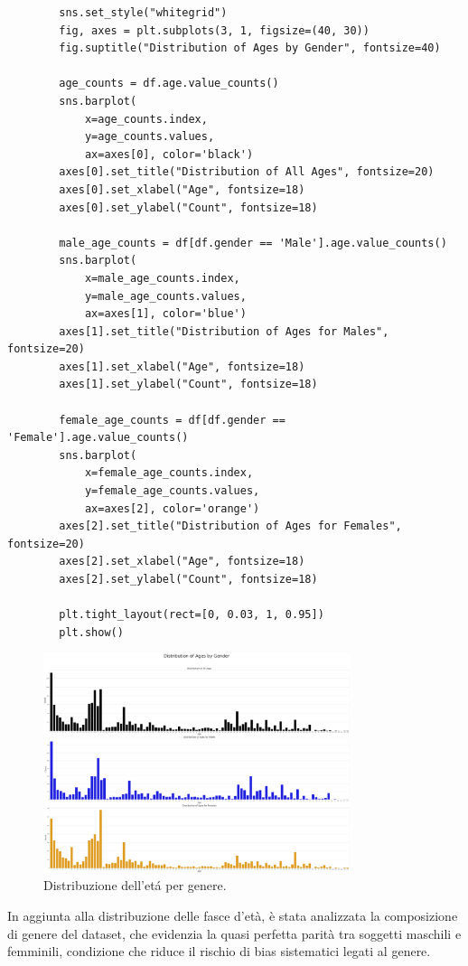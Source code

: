 \documentclass[a4paper,12pt]{report}
\begin{document}
	\begin{verbatim}
		sns.set_style("whitegrid")
		fig, axes = plt.subplots(3, 1, figsize=(40, 30))
		fig.suptitle("Distribution of Ages by Gender", fontsize=40) 
		
		age_counts = df.age.value_counts()
		sns.barplot(
			x=age_counts.index, 
			y=age_counts.values, 
			ax=axes[0], color='black')
		axes[0].set_title("Distribution of All Ages", fontsize=20)
		axes[0].set_xlabel("Age", fontsize=18)
		axes[0].set_ylabel("Count", fontsize=18)
		
		male_age_counts = df[df.gender == 'Male'].age.value_counts()
		sns.barplot(
			x=male_age_counts.index, 
			y=male_age_counts.values, 
			ax=axes[1], color='blue')
		axes[1].set_title("Distribution of Ages for Males", fontsize=20)
		axes[1].set_xlabel("Age", fontsize=18)
		axes[1].set_ylabel("Count", fontsize=18)
		
		female_age_counts = df[df.gender == 'Female'].age.value_counts()
		sns.barplot(
			x=female_age_counts.index, 
			y=female_age_counts.values, 
			ax=axes[2], color='orange')
		axes[2].set_title("Distribution of Ages for Females", fontsize=20)
		axes[2].set_xlabel("Age", fontsize=18)
		axes[2].set_ylabel("Count", fontsize=18)
		
		plt.tight_layout(rect=[0, 0.03, 1, 0.95])
		plt.show()
	\end{verbatim}
	
	\begin{figure}[H]
		\centering
		\includegraphics[width=0.8\textwidth]{img/ages_bygender_image.png}
		\caption{Distribuzione dell'etá per genere.}
	\end{figure}
	
	In aggiunta alla distribuzione delle fasce d'età, è stata analizzata la composizione di genere del dataset, che evidenzia la quasi perfetta parità tra soggetti maschili e femminili, condizione che riduce il rischio di bias sistematici legati al genere. \\
	
\end{document}
